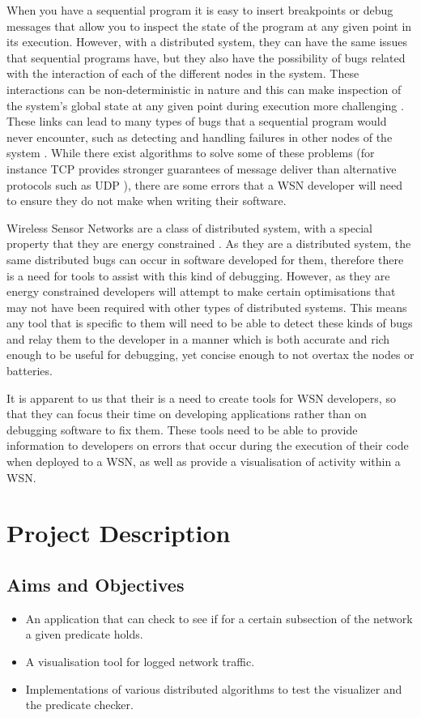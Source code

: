 \documentclass[a4paper]{article}
\begin{document}
When you have a sequential program it is easy to insert breakpoints or debug
messages that allow you to inspect the state of the program at any given point
in its execution. However, with a distributed system, they can have the same
issues that sequential programs have, but they also have the possibility of
bugs related with the interaction of each of the different nodes in the system.
These interactions can be non-deterministic \cite{liu2007wids} in nature and
this can make inspection of the system's global state at any given point during
execution more challenging \cite{chandy1985distributed}. These links can lead to
many types of bugs that a sequential program would never encounter, such as detecting and handling failures in other
nodes of the system \cite{5623434}. While there exist algorithms to solve some
of these problems (for instance TCP provides stronger guarantees of message
deliver than alternative protocols such as UDP
\cite[p.~532]{Tanenbaum:2002:CN:572404}), there are some errors that a WSN
developer will need to ensure they do not make when writing their software.

Wireless Sensor Networks are a class of distributed system, with a special
property that they are energy constrained \cite{6023235}. As they are a
distributed system, the same distributed bugs can occur in software developed
for them, therefore there is a need for tools to assist with this kind of
debugging. However, as they are energy constrained developers will attempt to
make certain optimisations that may not have been required with other types of
distributed systems. This means any tool that is specific to them will need to
be able to detect these kinds of bugs and relay them to the developer in a
manner which is both accurate and rich enough to be useful for debugging, yet 
concise enough to not overtax the nodes or batteries.

It is apparent to us that their is a need to create tools for WSN developers,
so that they can focus their time on developing applications rather than on
debugging software to fix them. These tools need to be able to provide
information to developers on errors that occur during the execution of their code 
when deployed to a WSN, as well as provide a visualisation of activity within a WSN.

\section{Project Description}

\subsection{Aims and Objectives}
\begin{itemize}
	\item An application that can check to see if for a certain subsection
of the network a given predicate holds.
	\item A visualisation tool for logged network traffic.
	\item Implementations of various distributed algorithms to test the
visualizer and the predicate checker.
\end{itemize}
\end{document}
